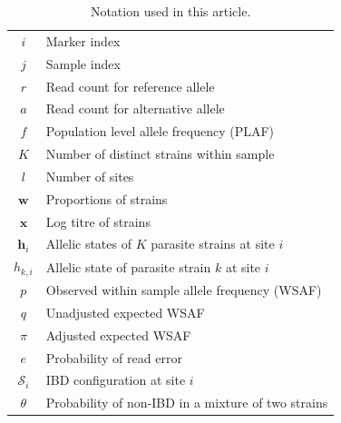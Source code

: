 \documentclass[9pt]{article}
\begin{document}
\begin{table}[htb]\centering
\begin{tabular}{c|l}\hline
$i$              & Marker index\\
$j$              & Sample index \\
$r$              & Read count for reference allele \\
$a$              & Read count for alternative allele \\
$f$              & Population level allele frequency (PLAF) \\
$K$              & Number of distinct strains within sample \\
$l$              & Number of sites\\
$\mathbf{w}$      & Proportions of strains \\
$\mathbf{x}$	& Log titre of strains \\
$\mathbf{h}_{i}$ & Allelic states of $K$ parasite strains at site $i$ \\
$h_{k,i}$   & Allelic state of parasite strain $k$ at site $i$\\
$p$              & Observed within sample allele frequency (WSAF) \\
$q$              & Unadjusted expected WSAF  \\
$\pi$            & Adjusted expected WSAF \\
$e$              & Probability of read error\\
$\mathcal{S}_{i}$ & IBD configuration at site $i$ \\
$\theta$ & Probability of non-IBD in a mixture of two strains \\
\hline
\end{tabular}
\vspace{.2cm}
\caption{Notation used in this article.}\label{tab:notation}
\end{table}
\end{document}
